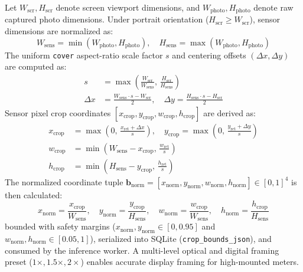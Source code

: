 \documentclass[conference]{IEEEtran}
\begin{document}
Let $W_{\text{scr}}, H_{\text{scr}}$ denote screen viewport dimensions, and $W_{\text{photo}}, H_{\text{photo}}$ denote raw captured photo dimensions. Under portrait orientation ($H_{\text{scr}} \ge W_{\text{scr}}$), sensor dimensions are normalized as:
\begin{equation}
W_{\text{sens}} = \min(W_{\text{photo}}, H_{\text{photo}}), \quad H_{\text{sens}} = \max(W_{\text{photo}}, H_{\text{photo}})
\label{eq:orientation_norm}
\end{equation}
The uniform \texttt{cover} aspect-ratio scale factor $s$ and centering offsets $(\Delta x, \Delta y)$ are computed as:
\begin{align}
s &= \max\left( \frac{W_{\text{scr}}}{W_{\text{sens}}}, \, \frac{H_{\text{scr}}}{H_{\text{sens}}} \right) \label{eq:cover_scale} \\
\Delta x &= \frac{W_{\text{sens}} \cdot s - W_{\text{scr}}}{2}, \quad \Delta y = \frac{H_{\text{sens}} \cdot s - H_{\text{scr}}}{2} \label{eq:cover_offsets}
\end{align}
Sensor pixel crop coordinates $[x_{\text{crop}}, y_{\text{crop}}, w_{\text{crop}}, h_{\text{crop}}]$ are derived as:
\begin{align}
x_{\text{crop}} &= \max\left(0, \, \frac{x_{\text{ret}} + \Delta x}{s}\right), \quad y_{\text{crop}} = \max\left(0, \, \frac{y_{\text{ret}} + \Delta y}{s}\right) \\
w_{\text{crop}} &= \min\left(W_{\text{sens}} - x_{\text{crop}}, \, \frac{w_{\text{ret}}}{s}\right) \\
h_{\text{crop}} &= \min\left(H_{\text{sens}} - y_{\text{crop}}, \, \frac{h_{\text{ret}}}{s}\right)
\end{align}
The normalized coordinate tuple $\mathbf{b}_{\text{norm}} = [x_{\text{norm}}, y_{\text{norm}}, w_{\text{norm}}, h_{\text{norm}}] \in [0, 1]^4$ is then calculated:
\begin{equation}
x_{\text{norm}} = \frac{x_{\text{crop}}}{W_{\text{sens}}}, \quad y_{\text{norm}} = \frac{y_{\text{crop}}}{H_{\text{sens}}}, \quad w_{\text{norm}} = \frac{w_{\text{crop}}}{W_{\text{sens}}}, \quad h_{\text{norm}} = \frac{h_{\text{crop}}}{H_{\text{sens}}}
\label{eq:norm_bounds}
\end{equation}
bounded with safety margins ($x_{\text{norm}}, y_{\text{norm}} \in [0, 0.95]$ and $w_{\text{norm}}, h_{\text{norm}} \in [0.05, 1]$), serialized into SQLite (\texttt{crop\_bounds\_json}), and consumed by the inference worker. A multi-level optical and digital framing preset ($1\times, 1.5\times, 2\times$) enables accurate display framing for high-mounted meters.
\end{document}
